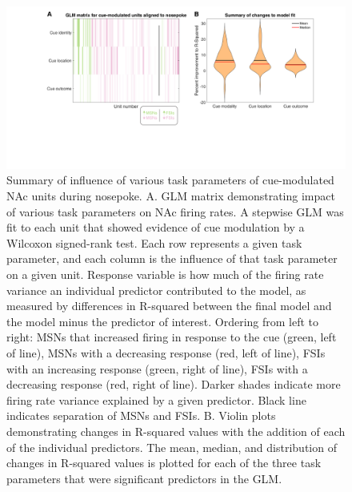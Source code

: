 \documentclass[11pt]{article}
\begin{document}
\begin{figure}[h]
\centering
\includegraphics[width=\textwidth]{Fig 9 - NP GLM.png}
\caption{Summary of influence of various task parameters of cue-modulated NAc units during nosepoke. A. GLM matrix demonstrating impact of various task parameters on NAc firing rates. A stepwise GLM was fit to each unit that showed evidence of cue modulation by a Wilcoxon signed-rank test. Each row represents a given task parameter, and each column is the influence of that task parameter on a given unit. Response variable is how much of the firing rate variance an individual predictor contributed to the model, as measured by differences in R-squared between the final model and the model minus the predictor of interest. Ordering from left to right: MSNs that increased firing in response to the cue (green, left of line), MSNs with a decreasing response (red, left of line), FSIs with an increasing response (green, right of line), FSIs with a decreasing response (red, right of line). Darker shades indicate more firing rate variance explained by a given predictor. Black line indicates separation of MSNs and FSIs. B. Violin plots demonstrating changes in R-squared values with the addition of each of the individual predictors. The mean, median, and distribution of changes in R-squared values is plotted for each of the three task parameters that were significant predictors in the GLM.}
\label{fig:NP_GLM}
\end{figure}
\end{document}
